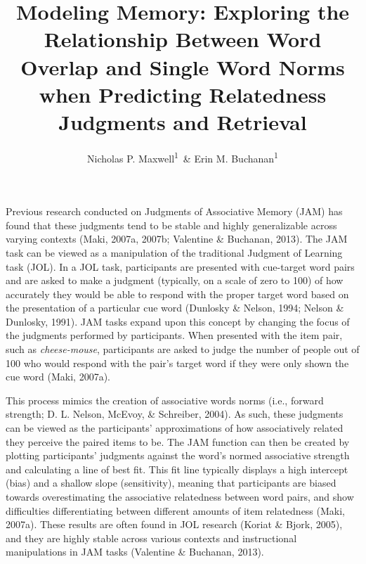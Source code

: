 \documentclass[english,man]{apa6}
\title{Modeling Memory: Exploring the Relationship Between Word Overlap and
Single Word Norms when Predicting Relatedness Judgments and Retrieval}
\author{Nicholas P. Maxwell\textsuperscript{1}~\& Erin M. Buchanan\textsuperscript{1}}
\affiliation{
    \vspace{0.5cm}
          \textsuperscript{1} Missouri State University  }
\theoremstyle{definition}
\theoremstyle{definition}
\theoremstyle{definition}
\theoremstyle{remark}
\begin{document}
\maketitle

\setcounter{secnumdepth}{0}



Previous research conducted on Judgments of Associative Memory (JAM) has
found that these judgments tend to be stable and highly generalizable
across varying contexts (Maki, 2007a, 2007b; Valentine \& Buchanan,
2013). The JAM task can be viewed as a manipulation of the traditional
Judgment of Learning task (JOL). In a JOL task, participants are
presented with cue-target word pairs and are asked to make a judgment
(typically, on a scale of zero to 100) of how accurately they would be
able to respond with the proper target word based on the presentation of
a particular cue word (Dunlosky \& Nelson, 1994; Nelson \& Dunlosky,
1991). JAM tasks expand upon this concept by changing the focus of the
judgments performed by participants. When presented with the item pair,
such as \emph{cheese-mouse}, participants are asked to judge the number
of people out of 100 who would respond with the pair's target word if
they were only shown the cue word (Maki, 2007a).

This process mimics the creation of associative words norms (i.e.,
forward strength; D. L. Nelson, McEvoy, \& Schreiber, 2004). As such,
these judgments can be viewed as the participants' approximations of how
associatively related they perceive the paired items to be. The JAM
function can then be created by plotting participants' judgments against
the word's normed associative strength and calculating a line of best
fit. This fit line typically displays a high intercept (bias) and a
shallow slope (sensitivity), meaning that participants are biased
towards overestimating the associative relatedness between word pairs,
and show difficulties differentiating between different amounts of item
relatedness (Maki, 2007a). These results are often found in JOL research
(Koriat \& Bjork, 2005), and they are highly stable across various
contexts and instructional manipulations in JAM tasks (Valentine \&
Buchanan, 2013).
\end{document}
